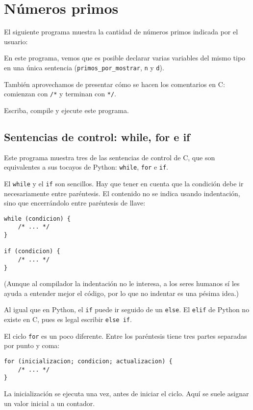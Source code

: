 \chapter{Números primos}

El siguiente programa muestra la cantidad de números primos indicada por
el usuario:

En este programa, vemos que es posible declarar varias variables del
mismo tipo en una única sentencia (\lstinline!primos_por_mostrar!,
\lstinline!n! y \lstinline!d!).

También aprovechamos de presentar cómo se hacen los comentarios en C:
comienzan con \lstinline!/*! y terminan con \lstinline!*/!.

Escriba, compile y ejecute este programa.

\section{Sentencias de control: while, for e if}

Este programa muestra tres de las sentencias de control de C, que son
equivalentes a sus tocayos de Python: \lstinline!while!, \lstinline!for!
e \lstinline!if!.

El \lstinline!while! y el \lstinline!if! son sencillos. Hay que tener en
cuenta que la condición debe ir necesariamente entre paréntesis. El
contenido no se indica usando indentación, sino que encerrándolo entre
paréntesis de llave:

\begin{lstlisting}
while (condicion) {
    /* ... */
}

if (condicion) {
    /* ... */
}
\end{lstlisting}

(Aunque al compilador la indentación no le interesa, a los seres humanos
sí les ayuda a entender mejor el código, por lo que no indentar es una
pésima idea.)

Al igual que en Python, el \lstinline!if! puede ir seguido de un
\lstinline!else!. El \lstinline!elif! de Python no existe en C, pues es
legal escribir \lstinline!else if!.

El ciclo \lstinline!for! es un poco diferente. Entre los paréntesis
tiene tres partes separadas por punto y coma:

\begin{lstlisting}
for (inicializacion; condicion; actualizacion) {
    /* ... */
}
\end{lstlisting}

La inicialización se ejecuta una vez, antes de iniciar el ciclo. Aquí se
suele asignar un valor inicial a un contador.

